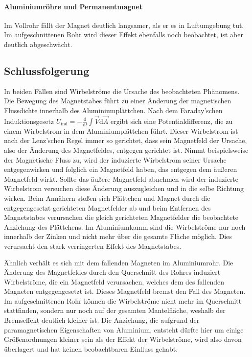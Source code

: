 \documentclass[
	a4paper,
	12pt,
	pagesize,
	ngerman
]{scrartcl}
\begin{document}
	\paragraph{Aluminiumröhre und Permanentmagnet}
	Im Vollrohr fällt der Magnet deutlich langsamer, als er es in Luftumgebung tut. Im aufgeschnittenen Rohr wird dieser Effekt ebenfalls noch beobachtet, ist aber deutlich abgeschwächt.
	\subsection{Schlussfolgerung}
	In beiden Fällen sind Wirbelströme die Ursache des beobachteten Phänomens.
	Die Bewegung des Magnetstabes führt zu einer Änderung der magnetischen Flussdichte innerhalb des Aluminiumplättchen. Nach dem Faraday'schen Induktionsgesetz $U_\text{ind}= - \frac{\text{d}}{\text{d}t} \int \vec{V} \text{d} \vec{A}$ ergibt sich eine Potentialdifferenz, die zu einem Wirbelstrom in dem Aluminiumplättchen führt. Dieser Wirbelstrom ist nach der Lenz'schen Regel immer so gerichtet, dass sein Magnetfeld der Ursache, also der Änderung des Magnetfeldes, entgegen gerichtet ist. Nimmt beispielsweise der Magnetische Fluss zu, wird der induzierte Wirbelstrom seiner Ursache entgegenwirken und folglich ein Magnetfeld haben, das entgegen dem äußeren Magnetfeld wirkt. Sollte das äußere Magnetfeld abnehmen wird der induzierte Wirbelstrom versuchen diese Änderung auszugleichen und in die selbe Richtung wirken. 
	Beim Annähern stoßen sich Plättchen und Magnet durch die entgegengesetzt gerichteten Magnetfelder ab und beim Entfernen des Magnetstabes verursachen die gleich gerichteten Magnetfelder die beobachtete Anziehung des Plättchens.
	Im Aluminiumkamm sind die Wirbelströme nur noch innerhalb der Zinken und nicht mehr über die gesamte Fläche möglich. Dies verursacht den stark verringerten Effekt des Magnetstabes. \par
	Ähnlich verhält es sich mit dem fallenden Magneten im Aluminiumrohr. Die Änderung des Magnetfeldes durch den Querschnitt des Rohres induziert Wirbelströme, die ein Magnetfeld verursachen, welches dem des fallenden Magneten entgegengesetzt ist. Dieses Magnetfeld bremst den Fall des Magneten. Im aufgeschnittenen Rohr können die Wirbelströme nicht mehr im Querschnitt stattfinden, sondern nur noch auf der gesamten Mantelfläche, weshalb der Bremseffekt deutlich kleiner ist. \newline %
	Die Anziehung, die aufgrund der paramagnetischen Eigenschaften von Aluminium, entsteht dürfte hier um einige Größenordnungen kleiner sein als der Effekt der Wirbelströme, wird also davon überlagert und hat keinen beobachtbaren Einfluss gehabt.
\end{document}
